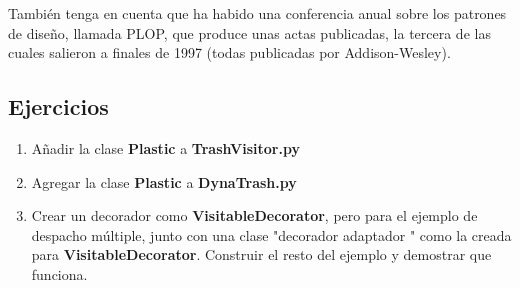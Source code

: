 También tenga en cuenta que ha habido una conferencia anual sobre los patrones de diseño, llamada PLOP, que produce unas actas publicadas, la tercera de las cuales salieron a finales de 1997 (todas publicadas por Addison-Wesley).   \newline

\subsection*{Ejercicios}
\label{subsec:Ejercicios14}

\begin{enumerate}
    
    \item Añadir la clase \textbf{Plastic} a \textbf{TrashVisitor.py}
    \item Agregar la clase \textbf{Plastic} a \textbf{DynaTrash.py}
    \item Crear un decorador como \textbf{VisitableDecorator}, pero para el ejemplo de despacho múltiple, junto con una clase "decorador adaptador " como la creada para \textbf{VisitableDecorator}. Construir el resto del ejemplo y demostrar que funciona.
    
\end{enumerate}